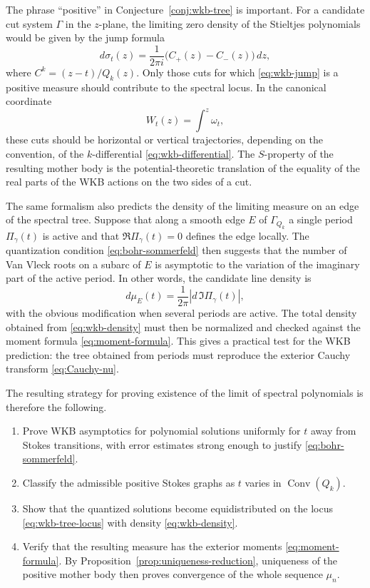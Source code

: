 \documentclass[10pt,twoside,a4paper,reqno]{amsart}
\theoremstyle{plain}
\theoremstyle{definition}
\theoremstyle{remark}
\DeclareMathOperator{\Conv}{Conv}
\begin{document}
The phrase ``positive'' in Conjecture~\ref{conj:wkb-tree} is important.  For a candidate cut system $\Gamma$ in the $z$-plane, the limiting zero density of the Stieltjes polynomials would be given by the jump formula
\begin{equation}
\label{eq:wkb-jump}
        d\sigma_t(z)=\frac{1}{2\pi i}
        \big(C_+(z)-C_-(z)\big)\,dz,
\end{equation}
where $C^k=(z-t)/Q_k(z)$.  Only those cuts for which \eqref{eq:wkb-jump} is a positive measure should contribute to the spectral locus.  In the canonical coordinate
\[
        W_t(z)=\int^z\omega_t,
\]
these cuts should be horizontal or vertical trajectories, depending on the convention, of the $k$-differential \eqref{eq:wkb-differential}.  The $S$-property of the resulting mother body is the potential-theoretic translation of the equality of the real parts of the WKB actions on the two sides of a cut.

The same formalism also predicts the density of the limiting measure on an edge of the spectral tree.  Suppose that along a smooth edge $E$ of $\Gamma_{Q_k}$ a single period $\Pi_\gamma(t)$ is active and that $\Re \Pi_\gamma(t)=0$ defines the edge locally.  The quantization condition \eqref{eq:bohr-sommerfeld} then suggests that the number of Van Vleck roots on a subarc of $E$ is asymptotic to the variation of the imaginary part of the active period.  In other words, the candidate line density is
\begin{equation}
\label{eq:wkb-density}
        d\mu_E(t)=\frac{1}{2\pi}
        \left|d\,\Im \Pi_\gamma(t)\right|,
\end{equation}
with the obvious modification when several periods are active.  The total density obtained from \eqref{eq:wkb-density} must then be normalized and checked against the moment formula \eqref{eq:moment-formula}.  This gives a practical test for the WKB prediction: the tree obtained from periods must reproduce the exterior Cauchy transform \eqref{eq:Cauchy-nu}.

The resulting strategy for proving existence of the limit of spectral polynomials is therefore the following.
\begin{enumerate}
\item Prove WKB asymptotics for polynomial solutions uniformly for $t$ away from Stokes transitions, with error estimates strong enough to justify \eqref{eq:bohr-sommerfeld}.
\item Classify the admissible positive Stokes graphs as $t$ varies in $\Conv(Q_k)$.
\item Show that the quantized solutions become equidistributed on the locus \eqref{eq:wkb-tree-locus} with density \eqref{eq:wkb-density}.
\item Verify that the resulting measure has the exterior moments \eqref{eq:moment-formula}.  By Proposition~\ref{prop:uniqueness-reduction}, uniqueness of the positive mother body then proves convergence of the whole sequence $\mu_n$.
\end{enumerate}
\end{document}
